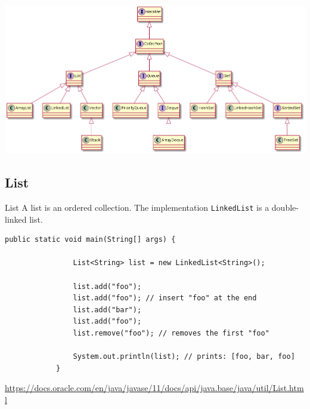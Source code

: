 	\begin{frame}
		\includegraphics[width=\textwidth]{07_collection/collection.png}
	\end{frame}
	
	
	\subsection{List}
	
	\begin{frame}[fragile]{List}
		A list is an ordered collection.
		\vfill
		The implementation \texttt{LinkedList} is a double-linked list.
		\begin{lstlisting}[basicstyle=\ttfamily\scriptsize]
			public static void main(String[] args) {
				
				List<String> list = new LinkedList<String>();
				
				list.add("foo"); 
				list.add("foo"); // insert "foo" at the end
				list.add("bar");
				list.add("foo");
				list.remove("foo"); // removes the first "foo"
				
				System.out.println(list); // prints: [foo, bar, foo]
			}
		\end{lstlisting}
		\url{https://docs.oracle.com/en/java/javase/11/docs/api/java.base/java/util/List.html}
	\end{frame}
	
